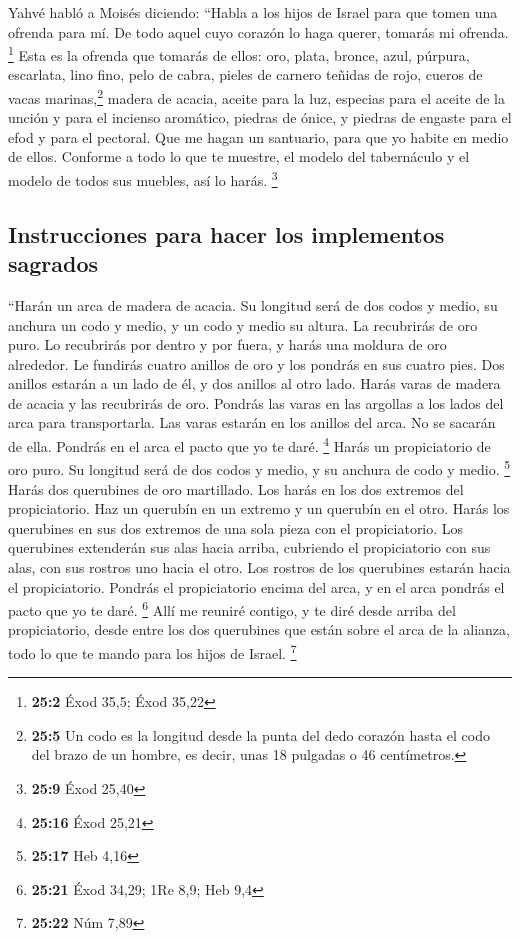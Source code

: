  Yahvé habló a Moisés diciendo:  ``Habla a
los hijos de Israel para que tomen una ofrenda para mí. De todo aquel
cuyo corazón lo haga querer, tomarás mi ofrenda. \footnote{\textbf{25:2}
  Éxod 35,5; Éxod 35,22}  Esta es la ofrenda que tomarás
de ellos: oro, plata, bronce,  azul, púrpura, escarlata,
lino fino, pelo de cabra,  pieles de carnero teñidas de
rojo, cueros de vacas marinas,\footnote{\textbf{25:5} Un codo es la
  longitud desde la punta del dedo corazón hasta el codo del brazo de un
  hombre, es decir, unas 18 pulgadas o 46 centímetros.} madera de
acacia,  aceite para la luz, especias para el aceite de la
unción y para el incienso aromático,  piedras de ónice, y
piedras de engaste para el efod y para el pectoral.  Que
me hagan un santuario, para que yo habite en medio de ellos.
 Conforme a todo lo que te muestre, el modelo del
tabernáculo y el modelo de todos sus muebles, así lo harás. \footnote{\textbf{25:9}
  Éxod 25,40}

\hypertarget{instrucciones-para-hacer-los-implementos-sagrados}{%
\subsection{Instrucciones para hacer los implementos
sagrados}\label{instrucciones-para-hacer-los-implementos-sagrados}}

 ``Harán un arca de madera de acacia. Su longitud será de
dos codos y medio, su anchura un codo y medio, y un codo y medio su
altura.  La recubrirás de oro puro. Lo recubrirás por
dentro y por fuera, y harás una moldura de oro alrededor.
 Le fundirás cuatro anillos de oro y los pondrás en sus
cuatro pies. Dos anillos estarán a un lado de él, y dos anillos al otro
lado.  Harás varas de madera de acacia y las recubrirás
de oro.  Pondrás las varas en las argollas a los lados
del arca para transportarla.  Las varas estarán en los
anillos del arca. No se sacarán de ella.  Pondrás en el
arca el pacto que yo te daré. \footnote{\textbf{25:16} Éxod 25,21}
 Harás un propiciatorio de oro puro. Su longitud será de
dos codos y medio, y su anchura de codo y medio. \footnote{\textbf{25:17}
  Heb 4,16}  Harás dos querubines de oro martillado. Los
harás en los dos extremos del propiciatorio.  Haz un
querubín en un extremo y un querubín en el otro. Harás los querubines en
sus dos extremos de una sola pieza con el propiciatorio. 
Los querubines extenderán sus alas hacia arriba, cubriendo el
propiciatorio con sus alas, con sus rostros uno hacia el otro. Los
rostros de los querubines estarán hacia el propiciatorio.
 Pondrás el propiciatorio encima del arca, y en el arca
pondrás el pacto que yo te daré. \footnote{\textbf{25:21} Éxod 34,29;
  1Re 8,9; Heb 9,4}  Allí me reuniré contigo, y te diré
desde arriba del propiciatorio, desde entre los dos querubines que están
sobre el arca de la alianza, todo lo que te mando para los hijos de
Israel. \footnote{\textbf{25:22} Núm 7,89}

